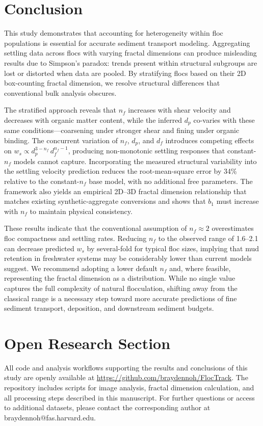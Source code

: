 \documentclass{agujournal2019}
\begin{document}
\section{Conclusion}
This study demonstrates that accounting for heterogeneity within floc populations is essential for accurate sediment transport modeling. Aggregating settling data across flocs with varying fractal dimensions can produce misleading results due to Simpson's paradox: trends present within structural subgroups are lost or distorted when data are pooled. By stratifying flocs based on their 2D box-counting fractal dimension, we resolve structural differences that conventional bulk analysis obscures. 

The stratified approach reveals that $n_f$ increases with shear velocity and decreases with organic matter content, while the inferred $d_p$ co-varies with these same conditions---coarsening under stronger shear and fining under organic binding. The concurrent variation of $n_f$, $d_p$, and $d_f$ introduces competing effects on $w_s \propto d_p^{3-n_f}\, d_f^{n_f-1}$, producing non-monotonic settling responses that constant-$n_f$ models cannot capture. Incorporating the measured structural variability into the settling velocity prediction reduces the root-mean-square error by 34\% relative to the constant-$n_f$ base model, with no additional free parameters. The framework also yields an empirical 2D--3D fractal dimension relationship that matches existing synthetic-aggregate conversions and shows that $b_1$ must increase with $n_f$ to maintain physical consistency. 

These results indicate that the conventional assumption of $n_f \approx 2$ overestimates floc compactness and settling rates. Reducing $n_f$ to the observed range of 1.6--2.1 can decrease predicted $w_s$ by several-fold for typical floc sizes, implying that mud retention in freshwater systems may be considerably lower than current models suggest. We recommend adopting a lower default $n_f$ and, where feasible, representing the fractal dimension as a distribution. While no single value captures the full complexity of natural flocculation, shifting away from the classical range is a necessary step toward more accurate predictions of fine sediment transport, deposition, and downstream sediment budgets.



\section*{Open Research Section}
All code and analysis workflows supporting the results and conclusions of this study are openly available at \url{https://github.com/braydennoh/FlocTrack}. The repository includes scripts for image analysis, fractal dimension calculation, and all processing steps described in this manuscript. For further questions or access to additional datasets, please contact the corresponding author at braydennoh@fas.harvard.edu.
\end{document}
